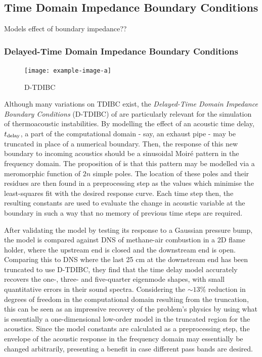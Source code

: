 \subsection{Time Domain Impedance Boundary Conditions}


Models effect of boundary impedance??


\subsubsection{Delayed-Time Domain Impedance Boundary Conditions}

\begin{figure}[t]
\centering
\texttt{[image: example-image-a]}
\caption{D-TDIBC}
\label{fig:D-TDIBC}
\end{figure}
        
Although many variations on TDIBC exist, the \emph{Delayed-Time Domain Impedance Boundary Conditions} (D-TDIBC) of \cite{douasbin2018DelayedtimeDomainImpedance} are particularly relevant for the simulation of thermoacoustic instabilities. By modelling the effect of an acoustic time delay, $t_{\rm{delay}}$, a part of the computational domain - say, an exhaust pipe - may be truncated in place of a numerical boundary. Then, the response of this new boundary to incoming acoustics should be a sinusoidal Moiré pattern in the frequency domain. The proposition of \cite{douasbin2018DelayedtimeDomainImpedance} is that this pattern may be modelled via a meromorphic function of $2n$ simple poles. The location of these poles and their residues are then found in a preprocessing step as the values which minimise the least-squares fit with the desired response curve. Each time step then, the resulting constants are used to evaluate the change in acoustic variable at the boundary in such a way that no memory of previous time steps are required. 

After validating the model by testing its response to a Gaussian pressure bump, the model is compared against DNS of methane-air combustion in a 2D flame holder, where the upstream end is closed and the downstream end is open. Comparing this to DNS where the last 25 cm at the downstream end has been truncated to use D-TDIBC, they find that the time delay model accurately recovers the one-, three- and five-quarter eigenmode shapes, with small quantitative errors in their sound spectra. Considering the $\sim 13\%$ reduction in degrees of freedom in the computational domain resulting from the truncation, this can be seen as an impressive recovery of the problem's physics by using what is essentially a one-dimensional low-order model in the truncated region for the acoustics. Since the model constants are calculated as a preprocessing step, the envelope of the acoustic response in the frequency domain may essentially be changed arbitrarily, presenting a benefit in case different pass bands are desired.

